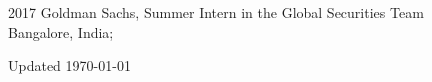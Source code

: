 \documentclass[12pt,letterpaper]{report}
\newcommand{\listitemspace}{0.15em}
\renewenvironment{itemize}
{\begin{list}{}{\setlength{\leftmargin}{0em}
            \setlength{\parskip}{0em}
            \setlength{\itemsep}{\listitemspace}
            \setlength{\parsep}{\listitemspace}}}
    {\end{list}}
\begin{document}
    \begin{tablist}

        \item[2017] \tab Goldman Sachs, Summer Intern in the Global Securities Team\\
        Bangalore, India; 



    \end{tablist}

%
%
%
%



    \begin{center}
        \vfill
        Updated \monthyeardate\today
    \end{center}
\end{document}
